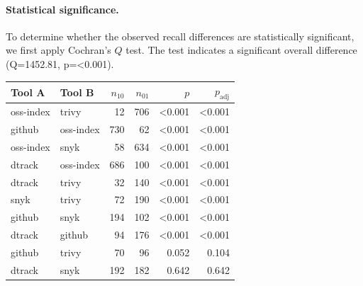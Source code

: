 \paragraph{Statistical significance.}
To determine whether the observed recall differences are statistically significant, we first apply Cochran's $Q$ test. The test indicates a significant overall difference (Q=1452.81, p=<0.001).

\begin{table}[!t]
\centering
\small
\begin{tabular}{llrrrr}
\toprule
Tool A & Tool B & $n_{10}$ & $n_{01}$ & $p$ & $p_{\mathrm{adj}}$ \\
\midrule
oss-index & trivy & 12 & 706 & <0.001 & <0.001 \\
github & oss-index & 730 & 62 & <0.001 & <0.001 \\
oss-index & snyk & 58 & 634 & <0.001 & <0.001 \\
dtrack & oss-index & 686 & 100 & <0.001 & <0.001 \\
dtrack & trivy & 32 & 140 & <0.001 & <0.001 \\
snyk & trivy & 72 & 190 & <0.001 & <0.001 \\
github & snyk & 194 & 102 & <0.001 & <0.001 \\
dtrack & github & 94 & 176 & <0.001 & <0.001 \\
github & trivy & 70 & 96 & 0.052 & 0.104 \\
dtrack & snyk & 192 & 182 & 0.642 & 0.642 \\
\bottomrule
\end{tabular}
\end{table}
